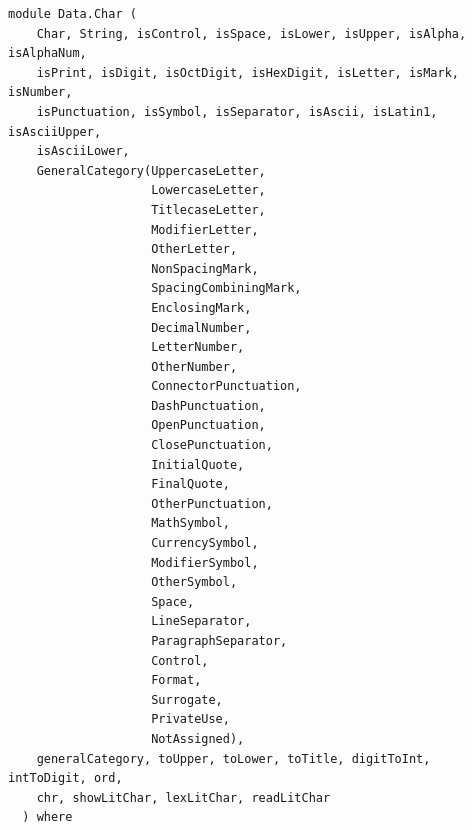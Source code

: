 \label{module:Data.Char}
\haddockbeginheader
{\haddockverb\begin{verbatim}
module Data.Char (
    Char, String, isControl, isSpace, isLower, isUpper, isAlpha, isAlphaNum,
    isPrint, isDigit, isOctDigit, isHexDigit, isLetter, isMark, isNumber,
    isPunctuation, isSymbol, isSeparator, isAscii, isLatin1, isAsciiUpper,
    isAsciiLower,
    GeneralCategory(UppercaseLetter,
                    LowercaseLetter,
                    TitlecaseLetter,
                    ModifierLetter,
                    OtherLetter,
                    NonSpacingMark,
                    SpacingCombiningMark,
                    EnclosingMark,
                    DecimalNumber,
                    LetterNumber,
                    OtherNumber,
                    ConnectorPunctuation,
                    DashPunctuation,
                    OpenPunctuation,
                    ClosePunctuation,
                    InitialQuote,
                    FinalQuote,
                    OtherPunctuation,
                    MathSymbol,
                    CurrencySymbol,
                    ModifierSymbol,
                    OtherSymbol,
                    Space,
                    LineSeparator,
                    ParagraphSeparator,
                    Control,
                    Format,
                    Surrogate,
                    PrivateUse,
                    NotAssigned),
    generalCategory, toUpper, toLower, toTitle, digitToInt, intToDigit, ord,
    chr, showLitChar, lexLitChar, readLitChar
  ) where\end{verbatim}}
\haddockendheader

